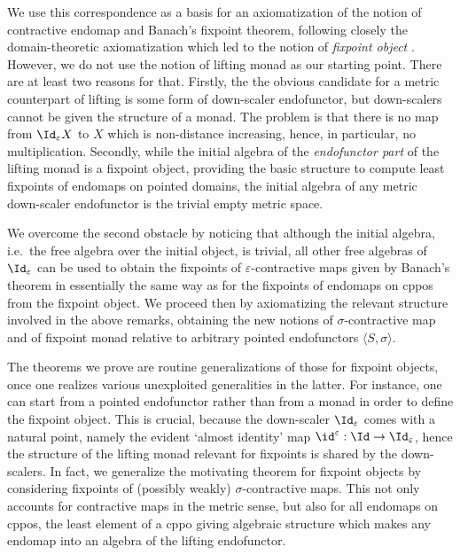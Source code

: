 \documentclass[11pt,a4paper]{article}
\newcommand{\tuple}[1]{\langle #1 \rangle }
\newcommand{\efunctor}{S}
\newcommand{\contr}{\sigma}
\newcommand{\pointedfunctor}{\tuple{\efunctor , \contr}}
\begin{document}
We use this correspondence as a basis for
an axiomatization of the notion of contractive endomap
and Banach's fixpoint theorem,
following closely the
domain-theoretic axiomatization
which led to the notion of \emph{fixpoint object} \cite{fpobject}.
However, we do not use 
the notion of lifting monad as our starting point.
There are at least two reasons for that. 
Firstly,
the the obvious candidate for 
a metric counterpart of lifting
is some form
of down-scaler endofunctor,
but down-scalers cannot be given the structure of a monad.
The problem is that there is no map from $\Id_\varepsilon X$ to $X$ which
is non-distance increasing, hence, in particular, no multiplication.
Secondly,
while
the initial algebra of the \emph{endofunctor part} of
the lifting monad is a fixpoint object,
providing the basic structure to compute least fixpoints
of endomaps on pointed domains,
the initial algebra of any
metric down-scaler endofunctor is the trivial empty metric space.

We overcome the second obstacle by noticing
that although the initial algebra,
i.e.\ the free algebra over the initial object,
is trivial,
all other free algebras of $\Id_\varepsilon$
can be used to obtain the 
fixpoints of $\varepsilon$-contractive maps given by Banach's theorem
in essentially the same way as for the fixpoints
of endomaps on cppos from the fixpoint object.
We proceed then by axiomatizing
the relevant structure involved
in the above remarks,
obtaining the new notions of $\contr$-contractive map
and of fixpoint monad relative to arbitrary pointed endofunctors
$\pointedfunctor$.

The theorems we prove are routine generalizations
of those for fixpoint objects,
once one realizes various unexploited generalities in the latter.
For instance, one can start from a pointed endofunctor
rather than from a monad in order to define the fixpoint object.
This is crucial, because the down-scaler $\Id_\varepsilon$ comes with
a natural point, namely the evident `almost identity' map 
$\id^\varepsilon : \Id \rightarrow \Id_\varepsilon$,
hence the structure of the lifting monad relevant 
for fixpoints is shared by the down-scalers.
In fact, we generalize the motivating theorem for fixpoint objects
\cite[Thm 4.3]{alex}
by considering fixpoints of (possibly weakly) $\contr$-contractive maps.
This not only accounts for contractive maps in the metric sense,
but also for all endomaps on cppos, the
least element of a cppo giving algebraic structure which
makes any endomap into an algebra of the lifting
endofunctor.
\end{document}
